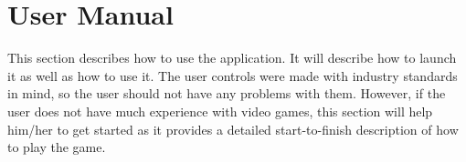 \section{User Manual}
This section describes how to use the application.
It will describe how to launch it as well as how to use it.
The user controls were made with industry standards in mind, so the user should not have any problems with them.
However, if the user does not have much experience with video games, this section will help him/her to get started as it provides a detailed start-to-finish description of how to play the game.








